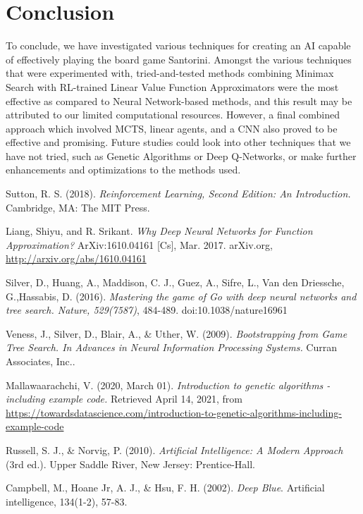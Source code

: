 \documentclass[a4paper,12pt,table]{article}
\begin{document}
\section{Conclusion}
To conclude, we have investigated various techniques for creating an AI capable of effectively playing the board game Santorini. Amongst the various techniques that were experimented with, tried-and-tested methods combining Minimax Search with RL-trained Linear Value Function Approximators were the most effective as compared to Neural Network-based methods, and this result may be attributed to our limited computational resources. However, a final combined approach which involved MCTS, linear agents, and a CNN also proved to be effective and promising. Future studies could look into other techniques that we have not tried, such as Genetic Algorithms or Deep Q-Networks, or make further enhancements and optimizations to the methods used.


\newpage
\begin{thebibliography}{9}
    Sutton, R. S. (2018). \textit{Reinforcement Learning, Second Edition: An Introduction.} Cambridge, MA: The MIT Press.

    Liang, Shiyu, and R. Srikant. \textit{Why Deep Neural Networks for Function Approximation?} ArXiv:1610.04161 [Cs], Mar. 2017. arXiv.org, \href{http://arxiv.org/abs/1610.04161}{http://arxiv.org/abs/1610.04161}

    Silver, D., Huang, A., Maddison, C. J., Guez, A., Sifre, L., Van den Driessche, G.,Hassabis, D. (2016). \textit{Mastering the game of Go with deep neural networks and tree search. Nature, 529(7587)}, 484-489. doi:10.1038/nature16961

    Veness, J., Silver, D., Blair, A., \& Uther, W. (2009). \textit{Bootstrapping from Game Tree Search. In Advances in Neural Information Processing Systems.} Curran Associates, Inc..

    Mallawaarachchi, V. (2020, March 01). \textit{Introduction to genetic algorithms - including example code.} Retrieved April 14, 2021, from 
    \href{https://towardsdatascience.com/introduction-to-genetic-algorithms-including-example-code-e396e98d8bf3#:~:text=A%20genetic%20algorithm%20is%20a,offspring%20of%20the%20next%20generation.}{https://towardsdatascience.com/introduction-to-genetic-algorithms-including-example-code}
    
    Russell, S. J., \& Norvig, P. (2010). \textit{Artificial Intelligence: A Modern Approach} (3rd ed.). Upper Saddle River, New Jersey: Prentice-Hall.
    
    Campbell, M., Hoane Jr, A. J., & Hsu, F. H. (2002). \textit{Deep Blue}. Artificial intelligence, 134(1-2), 57-83.

\end{thebibliography}
\end{document}
